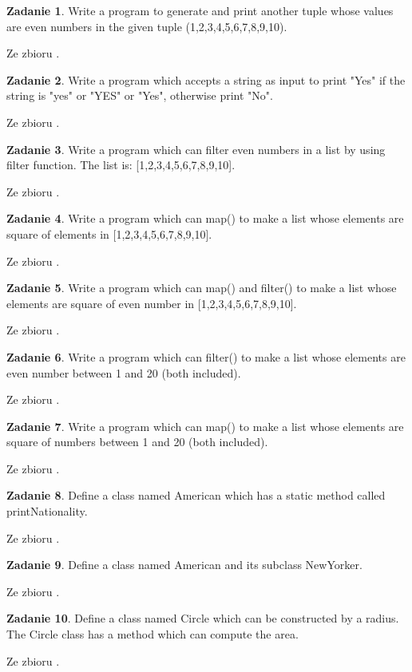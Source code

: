 \documentclass[11pt]{article}
\theoremstyle{definition}
\newtheorem{zadanie}{Zadanie}
\newcommand{\fromA}{\small Ze zbioru \cite{python100}.}
\begin{document}
\begin{zadanie}
Write a program to generate and print another tuple whose values are even numbers in the given tuple (1,2,3,4,5,6,7,8,9,10).

\fromA
\end{zadanie}
\begin{zadanie}
Write a program which accepts a string as input to print "Yes" if the string is "yes" or "YES" or "Yes", otherwise print "No".

\fromA
\end{zadanie}
\begin{zadanie}
Write a program which can filter even numbers in a list by using filter function. The list is: [1,2,3,4,5,6,7,8,9,10].

\fromA
\end{zadanie}
\begin{zadanie}
Write a program which can map() to make a list whose elements are square of elements in [1,2,3,4,5,6,7,8,9,10].

\fromA
\end{zadanie}
\begin{zadanie}
Write a program which can map() and filter() to make a list whose elements are square of even number in [1,2,3,4,5,6,7,8,9,10].

\fromA
\end{zadanie}
\begin{zadanie}
Write a program which can filter() to make a list whose elements are even number between 1 and 20 (both included).

\fromA
\end{zadanie}
\begin{zadanie}
Write a program which can map() to make a list whose elements are square of numbers between 1 and 20 (both included).

\fromA
\end{zadanie}
\begin{zadanie}
Define a class named American which has a static method called printNationality.

\fromA
\end{zadanie}
\begin{zadanie}
Define a class named American and its subclass NewYorker.

\fromA
\end{zadanie}
\begin{zadanie}
Define a class named Circle which can be constructed by a radius. The Circle class has a method which can compute the area.

\fromA
\end{zadanie}
\end{document}
